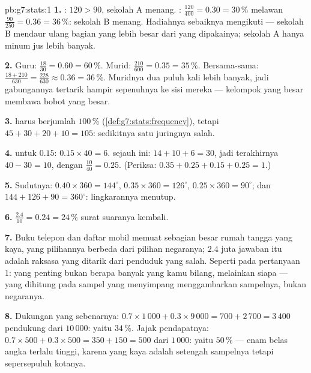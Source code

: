 \begin{solution}{pb:g7:stats:1}
\textbf{1.} : $120 > 90$, sekolah A menang. : $\frac{120}{400} = 0.30 = 30\,\%$ melawan
$\frac{90}{250} = 0.36 = 36\,\%$: sekolah B menang. Hadiahnya
sebaiknya mengikuti  --- sekolah B mendaur ulang
bagian yang lebih besar dari yang dipakainya; sekolah A hanya minum
jus lebih banyak.

\textbf{2.} Guru: $\frac{18}{30} = 0.60 = 60\,\%$. Murid:
$\frac{210}{600} = 0.35 = 35\,\%$. Bersama-sama:
$\frac{18 + 210}{630} = \frac{228}{630} \approx 0.36 =
36\,\%$. Muridnya dua puluh kali lebih banyak, jadi 
gabungannya tertarik hampir sepenuhnya ke sisi mereka --- kelompok
yang besar membawa bobot yang besar.

\textbf{3.}  harus berjumlah $100\,\%$
(\cref{def:g7:stats:frequency}), tetapi
$45 + 30 + 20 + 10 = 105$: sedikitnya satu juringnya salah.

\textbf{4.}  untuk  $0.15$:
$0.15 \times 40 = 6$.  sejauh ini: $14 + 10 + 6 = 30$, jadi
 terakhirnya $40 - 30 = 10$, dengan 
$\frac{10}{40} = 0.25$. (Periksa: $0.35 + 0.25 + 0.15 + 0.25 =
1$.)

\textbf{5.} Sudutnya: $0.40 \times 360 = 144^\circ$,
$0.35 \times 360 = 126^\circ$, $0.25 \times 360 = 90^\circ$;
dan $144 + 126 + 90 = 360^\circ$: lingkarannya menutup.

\textbf{6.} $\frac{2.4}{10} = 0.24 = 24\,\%$ surat suaranya
kembali.

\textbf{7.} Buku telepon dan daftar mobil memuat sebagian besar rumah
tangga yang kaya, yang pilihannya berbeda dari pilihan negaranya;
$2.4$ juta jawaban itu adalah  raksasa yang ditarik dari
penduduk yang salah. Seperti pada pertanyaan 1: yang penting bukan
berapa banyak yang kamu bilang, melainkan siapa --- 
yang dihitung pada sampel yang menyimpang menggambarkan sampelnya,
bukan negaranya.

\textbf{8.} Dukungan yang sebenarnya:
$0.7 \times 1\,000 + 0.3 \times 9\,000 = 700 + 2\,700 = 3\,400$
pendukung dari $10\,000$: yaitu $34\,\%$. Jajak pendapatnya:
$0.7 \times 500 + 0.3 \times 500 = 350 + 150 = 500$ dari
$1\,000$: yaitu $50\,\%$ --- enam belas angka terlalu tinggi, karena
yang kaya adalah setengah sampelnya tetapi sepersepuluh kotanya.


\end{solution}
